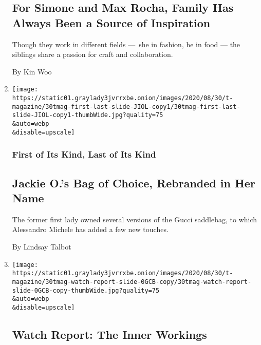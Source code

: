 \begin{enumerate}
{  \subsection{For Simone and Max Rocha, Family Has Always Been a Source
  of
  Inspiration}\label{for-simone-and-max-rocha-family-has-always-been-a-source-of-inspiration}}

  Though they work in different fields ---~she in fashion, he in food
  --- the siblings share a passion for craft and collaboration.

  By Kin Woo
\item
  \href{/2020/08/28/t-magazine/gucci-jackie-1961-saddlebag.html}{}

  \texttt{[image: https://static01.graylady3jvrrxbe.onion/images/2020/08/30/t-magazine/30tmag-first-last-slide-JIOL-copy1/30tmag-first-last-slide-JIOL-copy1-thumbWide.jpg?quality=75\\\&auto=webp\\\&disable=upscale]}

  \hypertarget{first-of-its-kind-last-of-its-kind}{%
  \subsubsection{First of Its Kind, Last of Its
  Kind}\label{first-of-its-kind-last-of-its-kind}}

  \hypertarget{jackie-os-bag-of-choice-rebranded-in-her-name}{%
  \subsection{Jackie O.'s Bag of Choice, Rebranded in Her
  Name}\label{jackie-os-bag-of-choice-rebranded-in-her-name}}

  The former first lady owned several versions of the Gucci saddlebag,
  to which Alessandro Michele has added a few new touches.

  By Lindsay Talbot
\item
  \href{/2020/08/27/t-magazine/skeleton-watches.html}{}

  \texttt{[image: https://static01.graylady3jvrrxbe.onion/images/2020/08/30/t-magazine/30tmag-watch-report-slide-0GCB-copy/30tmag-watch-report-slide-0GCB-copy-thumbWide.jpg?quality=75\\\&auto=webp\\\&disable=upscale]}

  \hypertarget{watch-report-the-inner-workings}{%
  \subsection{Watch Report: The Inner
  Workings}\label{watch-report-the-inner-workings}}


\end{enumerate}
